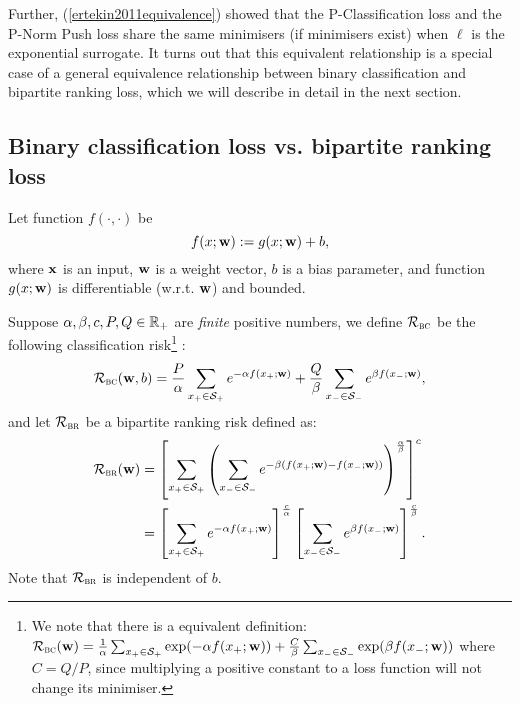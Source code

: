 Further, (\ref{ertekin2011equivalence}) showed that the P-Classification loss and the P-Norm Push loss share the same minimisers
(if minimisers exist) when $\ell$ is the exponential surrogate.
It turns out that this equivalent relationship is a special case of a general equivalence relationship 
between binary classification and bipartite ranking loss, which we will describe in detail in the next section.



\subsection{Binary classification loss vs. bipartite ranking loss}

Let function $f(\cdot, \cdot)$ be
$$
f(x; \mathbf{w}) := g(x; \mathbf{w}) + b,
$$
where $\mathbf{x}$ is an input, $\mathbf{w}$ is a weight vector, $b$ is a bias parameter, 
and function $g(x; \mathbf{w})$ is differentiable (w.r.t. $\mathbf{w}$) and bounded.

Suppose $\alpha, \beta, c, P, Q \in \mathbb{R}_+$ are \emph{finite} positive numbers, we define 
$\mathcal{R}_\textsc{bc}$ be the following classification risk\footnote{
We note that there is a equivalent definition:
$\mathcal{R}_\textsc{bc}(\mathbf{w}) = \frac{1}{\alpha} \sum_{x_+ \in \mathcal{S}_+} \exp(-\alpha f(x_+; \mathbf{w})) + 
\frac{C}{\beta} \sum_{x_- \in \mathcal{S}_-} \exp( \beta f(x_-; \mathbf{w}))$
where $C = Q/P$, since multiplying a positive constant to a loss function will not change its minimiser.}
:
\begin{equation*}
\mathcal{R}_\textsc{bc}(\mathbf{w}, b)
= \displaystyle 
  \frac{P}{\alpha} \sum_{x_+ \in \mathcal{S}_+} e^{-\alpha f(x_+; \mathbf{w})} +
  \frac{Q}{\beta}  \sum_{x_- \in \mathcal{S}_-} e^{ \beta  f(x_-; \mathbf{w})},
\end{equation*}
and let
$\mathcal{R}_\textsc{br}$ be a bipartite ranking risk defined as:
\begin{equation*}
\begin{aligned}
\mathcal{R}_\textsc{br}(\mathbf{w})
&= \left[ \displaystyle 
   \sum_{x_+ \in \mathcal{S}_+} \left( \sum_{x_- \in \mathcal{S}_-} e^{-\beta (f(x_+; \mathbf{w}) - f(x_-; \mathbf{w}))} \right)^\frac{\alpha}{\beta} 
   \right]^c \\
&= \left[ \sum_{x_+ \in \mathcal{S}_+} e^{-\alpha f(x_+; \mathbf{w})} \right]^\frac{c}{\alpha}
   \left[ \sum_{x_- \in \mathcal{S}_-} e^{ \beta  f(x_-; \mathbf{w})} \right]^\frac{c}{\beta}.
\end{aligned}
\end{equation*}
Note that $\mathcal{R}_\textsc{br}$ is independent of $b$.


